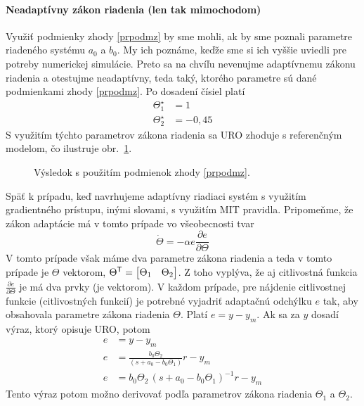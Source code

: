 \documentclass[a4paper, 10pt, ]{article}
\begin{document}
\paragraph{Neadaptívny zákon riadenia (len tak mimochodom)}
Využiť podmienky zhody \eqref{prpodmz} by sme mohli, ak by sme poznali parametre riadeného systému $a_0$ a $b_0$. My ich poznáme, keďže sme si ich vyššie uviedli pre potreby numerickej simulácie. Preto sa na chvíľu nevenujme adaptívnemu zákonu riadenia a otestujme neadaptívny, teda taký, ktorého parametre sú dané podmienkami zhody \eqref{prpodmz}. Po dosadení čísiel platí
\begin{subequations}
    \begin{align}
        \Theta_1^\star &= 1  \\
        \Theta_2^\star &= -0,45
    \end{align}
\end{subequations}
S využitím týchto parametrov zákona riadenia sa URO zhoduje s referenčným modelom, čo ilustruje obr.~\ref{fig_tex_01_1}.






\begin{figure}[t]
	\centering


	\caption{Výsledok s použitím podmienok zhody \eqref{prpodmz}.}
	\label{fig_tex_01_1}

\end{figure}




\bigskip

\noindent
Späť k prípadu, keď navrhujeme adaptívny riadiaci systém s využitím gradientného prístupu, inými slovami, s využitím MIT pravidla. Pripomeňme, že zákon adaptácie má v tomto prípade vo všeobecnosti tvar
\begin{equation}
	\dot \Theta = - \alpha e \frac{\partial e}{\partial \Theta}
\end{equation}
V tomto prípade však máme dva parametre zákona riadenia a teda v tomto prípade je $\Theta$ vektorom, $\Theta^{\mathsf{T}} = \begin{bmatrix} \Theta_1 & \Theta_2 \end{bmatrix}$. Z toho vyplýva, že aj citlivostná funkcia $\frac{\partial e}{\partial \Theta}$ je má dva prvky (je vektorom). V každom prípade, pre nájdenie citlivostnej funkcie (citlivostných funkcií) je potrebné vyjadriť adaptačnú odchýlku $e$ tak, aby obsahovala parametre zákona riadenia $\Theta$. Platí $e = y - y_m$. Ak sa za $y$ dosadí výraz, ktorý opisuje URO, potom
\begin{subequations}
    \begin{align}
        e &= y - y_m \\
        e &= \frac{b_0 \Theta_2}{\left( s + a_0 - b_0 \Theta_1 \right)} r - y_m \\
        e &= b_0 \Theta_2 \, \left( s + a_0 - b_0 \Theta_1 \right)^{-1} r - y_m
    \end{align}
\end{subequations}
Tento výraz potom možno derivovať podľa parametrov zákona riadenia $\Theta_1$ a $\Theta_2$.
\end{document}
